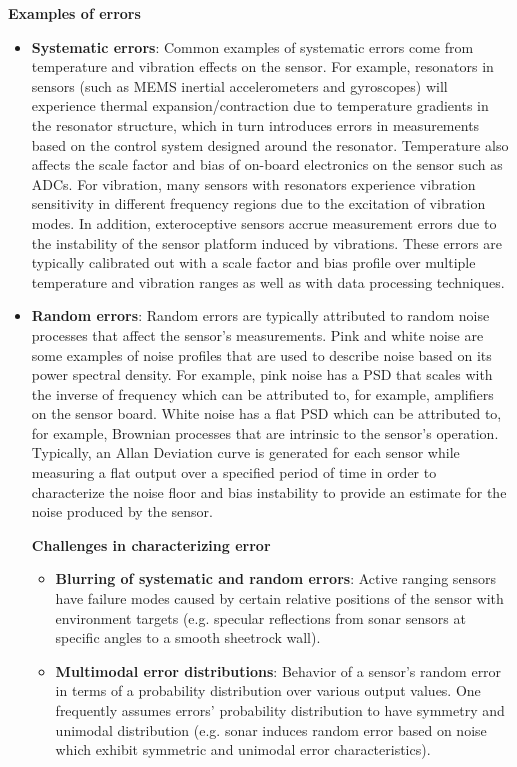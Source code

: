 \textbf{Examples of errors}
\begin{itemize}
    \item \textbf{Systematic errors}: Common examples of systematic errors come from temperature and vibration effects on the sensor.  For example, resonators in sensors (such as MEMS inertial accelerometers and gyroscopes) will experience thermal expansion/contraction due to temperature gradients in the resonator structure, which in turn introduces errors in measurements based on the control system designed around the resonator.  Temperature also affects the scale factor and bias of on-board electronics on the sensor such as ADCs.  For vibration, many sensors with resonators experience vibration sensitivity in different frequency regions due to the excitation of vibration modes.  In addition, exteroceptive sensors accrue measurement errors due to the instability of the sensor platform induced by vibrations.  These errors are typically calibrated out with a scale factor and bias profile over multiple temperature and vibration ranges as well as with data processing techniques.  
    \item \textbf{Random errors}: Random errors are typically attributed to random noise processes that affect the sensor's measurements.  Pink and white noise are some examples of noise profiles that are used to describe noise based on its power spectral density.  For example, pink noise has a PSD that scales with the inverse of frequency which can be attributed to, for example, amplifiers on the sensor board.  White noise has a flat PSD which can be attributed to, for example, Brownian processes that are intrinsic to the sensor's operation.  Typically, an Allan Deviation curve is generated for each sensor while measuring a flat output over a specified period of time in order to characterize the noise floor and bias instability to provide an estimate for the noise produced by the sensor. 

\textbf{Challenges in characterizing error}
\begin{itemize}
    \item \textbf{Blurring of systematic and random errors}: Active ranging sensors have failure modes caused by certain relative positions of the sensor with environment targets (e.g. specular reflections from sonar sensors at specific angles to a smooth sheetrock wall).
    \item \textbf{Multimodal error distributions}: Behavior of a sensor's random error in terms of a probability distribution over various output values. One frequently assumes errors' probability distribution to have symmetry and unimodal distribution (e.g. sonar induces random error based on noise which exhibit symmetric and unimodal error characteristics).
\end{itemize}


\end{itemize}
